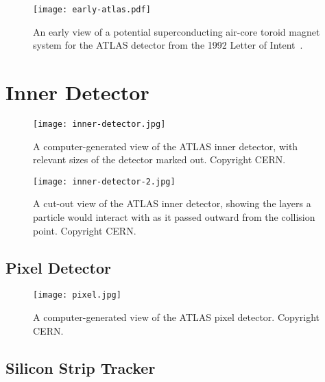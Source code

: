

\begin{figure}
\centering
\texttt{[image: early-atlas.pdf]}
\label{fig:detector:earlyatlas}
\caption{An early view of a potential superconducting air-core toroid magnet system for the ATLAS detector from the 1992 Letter of Intent~\cite{ATLAS-LoI}.}
\end{figure}


\section{Inner Detector}


\begin{figure}
\centering
\texttt{[image: inner-detector.jpg]}
\label{fig:detector:atlas}
\caption{A computer-generated view of the ATLAS inner detector, with relevant sizes of the detector marked out. Copyright CERN.}
\end{figure}



\begin{figure}
\centering
\texttt{[image: inner-detector-2.jpg]}
\label{fig:detector:atlas}
\caption{A cut-out view of the ATLAS inner detector, showing the layers a particle would interact with as it passed outward from the collision point. Copyright CERN.}
\end{figure}


\subsection{Pixel Detector}


\begin{figure}
\centering
\texttt{[image: pixel.jpg]}
\label{fig:detector:atlas}
\caption{A computer-generated view of the ATLAS pixel detector. Copyright CERN.}
\end{figure}




\subsection{Silicon Strip Tracker}


